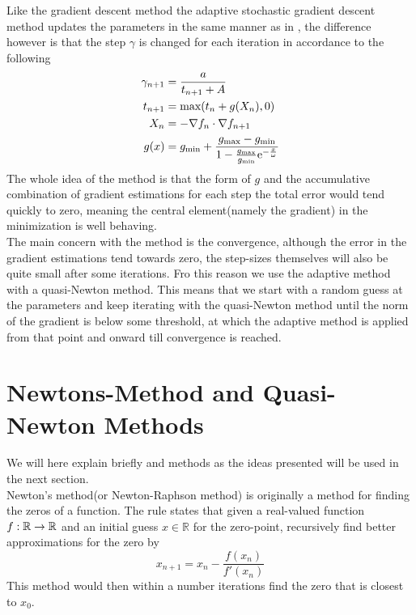     Like the gradient descent method the adaptive stochastic gradient descent
    method updates the parameters in the same manner as in ,
    the difference however is that the step $\gamma$ is changed for each
    iteration in accordance to the following
        \begin{equation}
            \begin{aligned}
                \gamma_{n+1} &= \frac{a}{t_{n+1} + A} \\
                t_{n+1} &= \text{max}(t_n + g(X_n), 0) \\
                X_n &= - \nabla f_n \cdot \nabla f_{n+1} \\
                g(x) &= g_{\text{min}} + \frac{g_{\text{max}} -
                g_{\text{min}}}{1 - \frac{g_{\text{max}}}{g_{\text{min}}}
                \mathrm{e}^{-\frac{x}{\omega}}}
            \end{aligned}
        \end{equation}
    The whole idea of the method is that the form of $g$ and the accumulative
    combination of gradient estimations for each step the total error would
    tend quickly to zero, meaning the central element(namely the gradient) in
    the minimization is well behaving. \\

    The main concern with the method is the convergence, although the error in
    the gradient estimations tend towards zero, the step-sizes themselves will
    also be quite small after some iterations. Fro this reason we use the
    adaptive method with a quasi-Newton method. This means that we start with a
    random guess at the parameters and keep iterating with the quasi-Newton
    method until the norm of the gradient is below some threshold, at which the
    adaptive method is applied from that point and onward till convergence is
    reached.

\section{Newtons-Method and Quasi-Newton
Methods\label{sec:newtons-method_and_quasi-newton_methods}}
    We will here explain briefly  and
     methods as the ideas presented will be used in the
    next section. \\

    Newton's method\cite{linalgDavid}(or Newton-Raphson method) is originally a
    method for finding the zeros of a function. The rule states that given a
    real-valued function $f:\mathbb{R}\rightarrow\mathbb{R}$ and an initial guess
    $x\in\mathbb{R}$ for the zero-point, recursively find better
    approximations for the zero by
        \begin{equation}
            x_{n+1} = x_n - \frac{f(x_n)}{f'(x_n)}
        \end{equation}
    This method would then within a number iterations find the zero that is
    closest to $x_0$.

